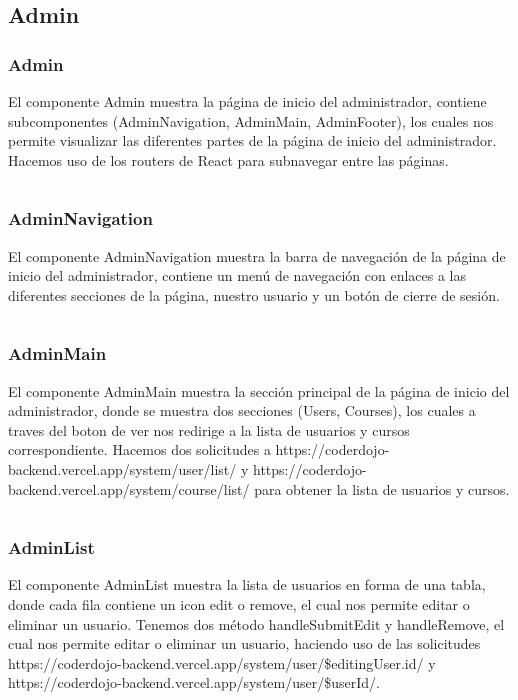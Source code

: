 \documentclass{article}
\begin{document}
\subsection{Admin}
\subsubsection{Admin}
El componente Admin muestra la página de inicio del administrador, contiene subcomponentes (AdminNavigation, AdminMain, AdminFooter), los cuales nos permite visualizar las diferentes partes de la página de inicio del administrador. Hacemos uso de los routers de React para subnavegar entre las páginas.
\inputminted{javascript}{../fronted/src/designUI/Admin/Admin.jsx}
\subsubsection{AdminNavigation}
El componente AdminNavigation muestra la barra de navegación de la página de inicio del administrador, contiene un menú de navegación con enlaces a las diferentes secciones de la página, nuestro usuario y un botón de cierre de sesión.
\inputminted{javascript}{../fronted/src/designUI/Admin/AdminNavigation.jsx}
\subsubsection{AdminMain}
El componente AdminMain muestra la sección principal de la página de inicio del administrador, donde se muestra dos secciones (Users, Courses), los cuales a traves del boton de ver nos redirige a la lista de usuarios y cursos correspondiente. Hacemos dos solicitudes a https://coderdojo-backend.vercel.app/system/user/list/ y https://coderdojo-backend.vercel.app/system/course/list/ para obtener la lista de usuarios y cursos.
\inputminted{javascript}{../fronted/src/designUI/Admin/AdminMain.jsx}
\subsubsection{AdminList}
El componente AdminList muestra la lista de usuarios en forma de una tabla, donde cada fila contiene un icon edit o remove, el cual nos permite editar o eliminar un usuario. Tenemos dos método handleSubmitEdit y handleRemove, el cual nos permite editar o eliminar un usuario, haciendo uso de las solicitudes https://coderdojo-backend.vercel.app/system/user/\${editingUser.id}/ y https://coderdojo-backend.vercel.app/system/user/\${userId}/.
\inputminted{javascript}{../fronted/src/designUI/Admin/AdminList.jsx}
\end{document}
